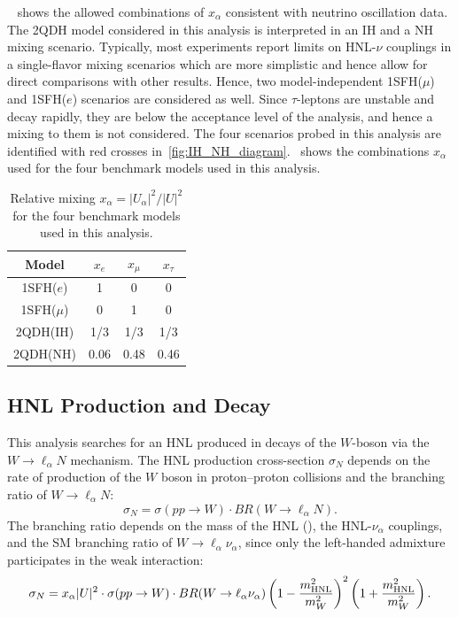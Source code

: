 ~ shows the allowed combinations of $x_\alpha$ consistent with neutrino oscillation data. The 2QDH model considered in this analysis is interpreted in an IH and a NH mixing scenario. Typically, most experiments report limits on HNL-$\nu$ couplings in a single-flavor mixing scenarios which are more simplistic and hence allow for direct comparisons with other results. Hence, two model-independent 1SFH($\mu$) and 1SFH($e$) scenarios are considered as well. Since $\tau$-leptons are unstable and decay rapidly, they are below the acceptance level of the analysis, and hence a mixing to them is not considered. The four scenarios probed in this analysis are identified with red crosses in~\cref{fig:IH_NH_diagram}.~ shows the combinations $x_\alpha$ used for the four benchmark models used in this analysis.


\begin{table}[!htbp]
    \centering
    \begin{tabular}{cccc}
    \hline\hline
        Model & $x_e$ & $x_\mu$ & $x_\tau$ \\
        \hline
        1SFH($e$) & 1 & 0 & 0 \\
        1SFH($\mu$) & 0 & 1 & 0 \\
        2QDH(IH) & 1/3 & 1/3 & 1/3 \\
        2QDH(NH) & 0.06 & 0.48 & 0.46 \\
        \hline
    \end{tabular}
    \caption{Relative mixing $x_\alpha = |U_\alpha|^2 / |U|^2$ for the four benchmark models used in this analysis.}
    \label{tab:hnl_models}
\end{table}

\subsection{HNL Production and Decay}
This analysis searches for an HNL produced in decays of the $W$-boson via the $W\to \ell_\alpha N$ mechanism. The HNL production cross-section $\sigma_N$ depends on the rate of production of the $W$ boson in proton--proton collisions and the branching ratio of $W\to \ell_\alpha N$:
\begin{equation}
    \sigma_N = \sigma(pp\to W) \cdot BR(W\to \ell_\alpha N).
\end{equation}
The branching ratio depends on the mass of the HNL (\mhnl), the HNL-$\nu_\alpha$ couplings, and the SM branching ratio of $W\to \ell_\alpha \nu_\alpha$, since only the left-handed admixture participates in the weak interaction:
\begin{equation}
     \sigma_N = x_\alpha |U|^2 \cdot \sigma(pp\to W) \cdot BR(W\to \ell_\alpha \nu_\alpha) \left( 1-\frac{m_{\mathrm{HNL}}^2}{m_W^2} \right)^2 \left( 1+\frac{m_{\mathrm{HNL}}^2}{m_W^2} \right).
\end{equation}

